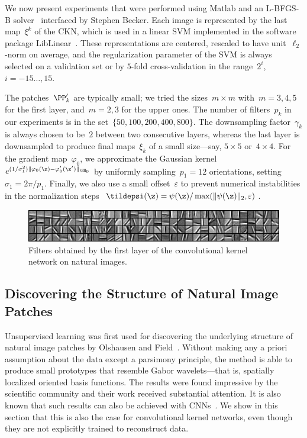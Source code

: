 \vsb
We now present experiments that were performed using Matlab and an L-BFGS-B
solver~\cite{byrd1995} interfaced by Stephen Becker. Each image is represented by the last map~$\xi^k$ of the CKN, which is used in a linear SVM implemented in the
software package LibLinear~\cite{fan2}. 
These representations are centered, rescaled to have unit~$\ell_2$-norm on
average, and the regularization parameter of the SVM is always selected on a validation
set or by $5$-fold cross-validation in the range~$2^i$,
$i=-15\ldots,15$.

The patches~$\PP_k'$ are typically small; we tried the sizes~$m \times m$
with~$m=3,4,5$ for the first layer, and~$m=2,3$ for the upper ones. The number
of filters~$p_k$ in our experiments is in the set~$\{50,100,200,400,800\}$. The
downsampling factor~$\gamma_k$ is always chosen to be~$2$ between two
consecutive layers, whereas the last layer is downsampled to produce final
maps~$\xi_k$ of a small size---say, $5 \times 5$ or~$4 \times 4$. 
For the gradient map~$\varphi_0$, we approximate the Gaussian kernel
$e^{(1/\sigma_1^2)\|\varphi_0(\z)-\varphi_0'(\z')\|_{\HH_0}}$ by uniformly
sampling~$p_1=12$ orientations, setting~$\sigma_1=2\pi/p_1$.
Finally, we also use a small offset~$\varepsilon$ to prevent numerical
instabilities in the normalization steps~$\tildepsi(\z)= \psi(\z)/\max(\|\psi(\z)\|_2,\varepsilon)$.


\begin{figure}[b!]%
   \centering
\vs
\includegraphics[width=12.5cm]{gabors_final.eps}
\vs
\caption{Filters obtained by the first layer of the convolutional kernel network on natural images.}\label{fig:gabors}
\end{figure}

\vsb
\subsection{Discovering the Structure of Natural Image Patches}\label{sec:gabors}
\vsb
Unsupervised learning was first used for discovering the underlying structure
of natural image patches by Olshausen and Field~\cite{olshausen}.  Without
making any a priori assumption about the data except a parsimony principle, the
method is able to produce small prototypes that resemble Gabor wavelets---that
is, spatially localized oriented basis functions. The results were found
impressive by the scientific community and their work received substantial
attention. It is also known that such results can also be achieved with
CNNs~\cite{ranzato2007}. We show in this section that this is also the case for
convolutional kernel networks, even though they are not explicitly trained to reconstruct
data.

